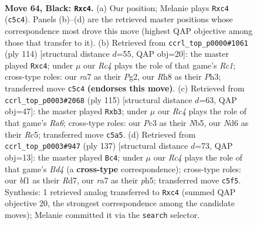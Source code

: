 \documentclass[11pt]{article}
\begin{document}
\clearpage

\begin{figure}[p]\centering
\begin{subfigure}{0.46\textwidth}\centering
\resizebox{\linewidth}{!}{%
\newchessgame
\chessboard[
  setfen={4k2r/R6p/P2n4/2r5/2R5/1Pp3KP/2P3P1/5B2 b - - 6 64},
  showmover=false,
  pgfstyle=straightmove, color=movearrow, markmove={c5-c4}
]}
\caption{}
\end{subfigure}\hfill
\begin{subfigure}{0.46\textwidth}\centering
\resizebox{\linewidth}{!}{%
\newchessgame
\chessboard[
  setfen={5b2/2B3p1/3p1pkp/1P1R4/2r1r3/7P/6P1/2R4K w - - 0 58},
  showmover=false,
  pgfstyle=straightmove, color=movearrow, markmove={c1-c4}
]}
\caption{}
\end{subfigure}
\\[4pt]
\begin{subfigure}{0.46\textwidth}\centering
\resizebox{\linewidth}{!}{%
\newchessgame
\chessboard[
  setfen={8/5pk1/6p1/1nrB4/4P1P1/rR2PK2/3p4/3R4 b - - 2 58},
  showmover=false,
  pgfstyle=straightmove, color=movearrow, markmove={a3-b3}
]}
\caption{}
\end{subfigure}\hfill
\begin{subfigure}{0.46\textwidth}\centering
\resizebox{\linewidth}{!}{%
\newchessgame
\chessboard[
  setfen={8/3r2pk/8/1p1bR2P/1B1P1K1P/P7/2r5/6R1 b - - 0 69},
  showmover=false,
  pgfstyle=straightmove, color=movearrow, markmove={d5-c4}
]}
\caption{}
\end{subfigure}
\caption{\textbf{Move 64, Black: \texttt{Rxc4}.} (a) Our position; Melanie plays \texttt{Rxc4} (\texttt{c5c4}). Panels (b)--(d) are the retrieved master positions whose correspondence most drove this move (highest QAP objective among those that transfer to it). (b) Retrieved from \texttt{ccrl\_top\_p0000\#1061} (ply 114) [structural distance $d$=55, QAP obj=20]: the master played \texttt{Rxc4}; under $\mu$ our \emph{Rc4} plays the role of that game's \emph{Rc1}; cross-type roles: our \emph{r}a7 as their \emph{P}g2, our \emph{R}h8 as their \emph{P}h3; transferred move \texttt{c5c4} \textbf{(endorses this move)}. (c) Retrieved from \texttt{ccrl\_top\_p0003\#2068} (ply 115) [structural distance $d$=63, QAP obj=47]: the master played \texttt{Rxb3}; under $\mu$ our \emph{Rc4} plays the role of that game's \emph{Ra6}; cross-type roles: our \emph{P}c3 as their \emph{N}b5, our \emph{N}d6 as their \emph{R}c5; transferred move \texttt{c5a5}. (d) Retrieved from \texttt{ccrl\_top\_p0003\#947} (ply 137) [structural distance $d$=73, QAP obj=13]: the master played \texttt{Bc4}; under $\mu$ our \emph{Rc4} plays the role of that game's \emph{Bd4} (a \textbf{cross-type} correspondence); cross-type roles: our \emph{b}f1 as their \emph{R}d7, our \emph{r}a7 as their \emph{p}h5; transferred move \texttt{c5f5}. Synthesis: 1 retrieved analog transferred to \texttt{Rxc4} (summed QAP objective 20, the strongest correspondence among the candidate moves); Melanie committed it via the \texttt{search} selector.}
\label{fig:thought-m127}
\end{figure}
\end{document}
